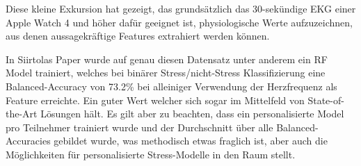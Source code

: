 Diese kleine Exkursion hat gezeigt, das grundsätzlich das 30-sekündige \ac{EKG} einer Apple Watch 4 und höher dafür geeignet ist, physiologische Werte aufzuzeichnen, aus denen aussagekräftige Features extrahiert werden können.

In Siirtolas Paper wurde auf genau diesen Datensatz unter anderem ein \ac{RF} Model trainiert, welches bei binärer Stress/nicht-Stress Klassifizierung eine Balanced-Accuracy von 73.2\% bei alleiniger Verwendung der Herzfrequenz als Feature erreichte. \cite{Siirtola2019}
Ein guter Wert welcher sich sogar im Mittelfeld von State-of-the-Art Lösungen hält. Es gilt aber zu beachten, dass ein personalisierte Model pro Teilnehmer trainiert wurde und der Durchschnitt über alle Balanced-Accuracies gebildet wurde, was methodisch etwas fraglich ist, 
aber auch die Möglichkeiten für personalisierte Stress-Modelle in den Raum stellt.



    

    
